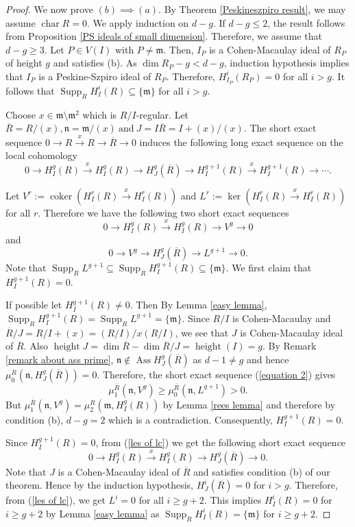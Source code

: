 \documentclass[12pt,reqno]{amsart}
\theoremstyle{definition}
\newcommand{\m}{\mathfrak{m}}
\newcommand{\n}{\mathfrak{n}}
\newcommand{\Ass}{\operatorname{Ass}}
\newcommand{\height}{\operatorname{height}}
\newcommand{\Supp}{\operatorname{Supp}}
\newcommand{\coker}{\operatorname{coker}}
\newcommand{\Char}{\operatorname{char}}
\begin{document}
\begin{proof}
    We now prove $(b)\implies (a)$. By Theorem \ref{Peskineszpiro result}, we may assume $\Char R=0$. We apply induction on $d-g$. If $d-g\leq 2$, the result follows from Proposition \ref{PS ideals of small dimension}. Therefore, we assume that $d-g\geq 3$. Let $P\in V(I)$ with $P\neq \m$. Then, $I_P$ is a Cohen-Macaulay ideal of $R_P$ of height $g$ and satisfies (b). As $\dim R_P-g<d-g$, induction hypothesis implies that $I_P$ is a Peskine-Szpiro ideal of $R_P$. Therefore, $H^i_{I_P}(R_P)=0$ for all $i>g$. It follows that $\Supp_R H^i_I(R)\subseteq\{\m\}$ for all $i>g$.

    Choose $x\in \m\setminus \m^2$ which is $R/I$-regular. Let $\overline{R}=R/(x), \n=\m/(x) \ \text{and} \ J=I\overline{R}=I+(x)/(x)$. The short exact sequence $0\to R\xrightarrow{x}R\to \overline{R}\to 0$ induces the following long exact sequence on the local cohomology
    \begin{equation}\label{les of lc}
        0\to H^g_I(R)\xrightarrow{x}H^g_I(R)\to H^g_J(\overline{R})\to H^{g+1}_I(R)\xrightarrow{x}H^{g+1}_I(R)\to \cdots.
    \end{equation}

Let $V^r:=\coker(H^r_I(R)\xrightarrow{x}H^r_I(R))$ and $L^r:=\ker(H^{r}_I(R)\xrightarrow{x}H^{r}_I(R))$ for all $r$. Therefore we have the following two short exact sequences \begin{equation}\label{equation 1}
    0\to H^g_I(R)\xrightarrow{x}H^g_I(R)\to V^g\to 0
\end{equation}
and \begin{equation}\label{equation 2}
    0\to V^g \to H^g_J(\overline{R})\to L^{g+1} \to 0.
\end{equation}
Note that $\Supp_R L^{g+1}\subseteq \Supp_R H^{g+1}_I(R)\subseteq\{\m\}.$ We first claim that $H^{g+1}_I(R)= 0$.

If possible let $H^{g+1}_I(R)\neq 0$. Then By Lemma \ref{easy lemma}, $\Supp_R H^{g+1}_I(R)=\Supp_R L^{g+1}=\{\m\}$. 
Since $R/I$ is Cohen-Macaulay and  $\overline{R}/J=R/I+(x)=(R/I)/x (R/I)$, we see that $J$ is Cohen-Macaulay ideal of $\overline{R}$. Also $\height J=\dim \overline{R}-\dim \overline{R}/J=\height(I)=g$. By Remark \ref{remark about ass prime}, $\n\notin\Ass H^g_J(\overline{R})$ as $d-1\neq g$ and hence $\mu^{\overline{R}}_0\left(\n,H^g_J(\overline{R})\right)=0$. Therefore, the short exact sequence (\ref{equation 2}) gives $$\mu^{\overline{R}}_1\left(\n,V^g\right)\geq \mu^{\overline{R}}_0(\n,L^{g+1})>0.$$
But $\mu^{\overline{R}}_1(\n,V^g)=\mu^R_2\left(\m,H^g_I(R)\right)$ by Lemma \ref{rees lemma} and therefore by condition (b), $d-g=2$ which is a contradiction. Consequently, $H^{g+1}_I(R)=0$.

Since $H^{g+1}_I(R)=0$, from (\ref{les of lc}) we get the following short exact sequence $$ 0\to H^g_I(R)\xrightarrow{x}H^g_I(R)\to H^g_J(\overline{R})\to 0.$$
Note that $J$ is a Cohen-Macaulay ideal of $\overline{R}$ and satisfies condition (b) of our theorem. Hence by the induction hypothesis, $H^i_J(\overline{R})=0$ for $i>g$. Therefore, from (\ref{les of lc}), we get $L^i=0$ for all $i\geq g+2$. This implies $H^i_I(R)=0$ for $i\geq g+2$ by Lemma \ref{easy lemma} as $\Supp_R H^i_I(R)=\{\m\}$ for $i\geq g+2$.
\end{proof}
\end{document}
